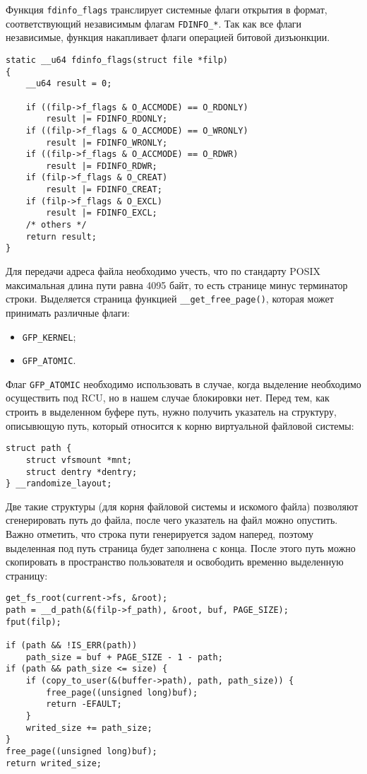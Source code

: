 Функция \texttt{fdinfo\_flags} транслирует системные флаги открытия в формат,
соответствующий независимым флагам \texttt{FDINFO\_*}. Так как все флаги
независимые, функция накапливает флаги операцией битовой дизъюнкции.
\medskip
\begin{lstlisting}[style=cstyle]
static __u64 fdinfo_flags(struct file *filp)
{
	__u64 result = 0;

	if ((filp->f_flags & O_ACCMODE) == O_RDONLY)
		result |= FDINFO_RDONLY;
	if ((filp->f_flags & O_ACCMODE) == O_WRONLY)
		result |= FDINFO_WRONLY;
	if ((filp->f_flags & O_ACCMODE) == O_RDWR)
		result |= FDINFO_RDWR;
	if (filp->f_flags & O_CREAT)
		result |= FDINFO_CREAT;
	if (filp->f_flags & O_EXCL)
		result |= FDINFO_EXCL;
	/* others */
	return result;
}
\end{lstlisting}
\medskip

Для передачи адреса файла необходимо учесть, что по стандарту POSIX максимальная
длина пути равна 4095 байт, то есть странице минус терминатор строки. Выделяется
страница функцией \texttt{\_\_get\_free\_page()}, которая может принимать
различные флаги:
\begin{itemize}
\item \texttt{GFP\_KERNEL};
\item \texttt{GFP\_ATOMIC}.
\end{itemize}

Флаг \texttt{GFP\_ATOMIC} необходимо использовать в случае, когда выделение
необходимо осуществить под RCU, но в нашем случае блокировки нет. Перед тем, как
строить в выделенном буфере путь, нужно получить указатель на структуру,
описывющую путь, который относится к корню виртуальной файловой системы: 
\medskip
\begin{lstlisting}[style=cstyle]
struct path {
	struct vfsmount *mnt;
	struct dentry *dentry;
} __randomize_layout;
\end{lstlisting}
\medskip

Две такие структуры (для корня файловой системы и искомого файла) позволяют
сгенерировать путь до файла, после чего указатель на файл можно опустить. Важно
отметить, что строка пути генерируется задом наперед, поэтому выделенная под
путь страница будет заполнена с конца. После этого путь можно скопировать в
пространство пользователя и освободить временно выделенную страницу:
\medskip
\begin{lstlisting}[style=cstyle]
get_fs_root(current->fs, &root);
path = __d_path(&(filp->f_path), &root, buf, PAGE_SIZE);
fput(filp);

if (path && !IS_ERR(path))
	path_size = buf + PAGE_SIZE - 1 - path;
if (path && path_size <= size) {
	if (copy_to_user(&(buffer->path), path, path_size)) {
		free_page((unsigned long)buf);
		return -EFAULT;
	}
	writed_size += path_size;
}
free_page((unsigned long)buf);
return writed_size;
\end{lstlisting}
\medskip

